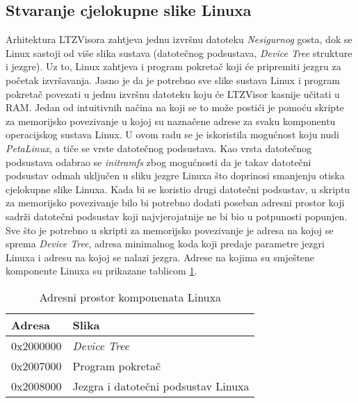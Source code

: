 \documentclass[times, utf8, diplomski, numeric]{fer}
\begin{document}
\subsection{Stvaranje cjelokupne slike Linuxa}
Arhitektura LTZVisora zahtjeva jednu izvršnu datoteku \textit{Nesigurnog} gosta, dok se Linux sastoji od više slika sustava (datotečnog
podsustava, \textit{Device Tree} strukture i jezgre). Uz to, Linux zahtjeva i program pokretač koji će pripremiti jezgru za
početak izvršavanja. Jasno je da je potrebno sve slike sustava Linux i program pokretač povezati u jednu izvršnu datoteku
koju će LTZVisor kasnije učitati u RAM. Jedan od intuitivnih načina na koji se to može postići je pomoću skripte za memorijsko
povezivanje u kojoj su naznačene adrese za svaku komponentu operacijskog sustava Linux. U ovom radu se je iskoristila mogućnost
koju nudi \textit{PetaLinux}, a tiče se vrste datotečnog podsustava. Kao vrsta datotečnog podsustava odabrao se
\textit{initramfs} zbog mogućnosti da je takav datotečni podsustav odmah uključen u sliku jezgre Linuxa što doprinosi smanjenju
otiska cjelokupne slike Linuxa. Kada bi se koristio drugi datotečni podsustav, u skriptu za memorijsko povezivanje bilo bi
potrebno dodati poseban adresni prostor koji sadrži datotečni podsustav koji najvjerojatnije ne bi bio u potpunosti popunjen.
Sve što je potrebno u skripti za memorijsko povezivanje je adresa na kojoj se sprema \textit{Device Tree}, adresa minimalnog
koda koji predaje parametre jezgri Linuxa i adresu na kojoj se nalazi jezgra. Adrese na kojima su smještene komponente Linuxa
su prikazane tablicom \ref{adr_space}.

\begin{table}[H]
  \centering
  \begin{tabular}{ | p{3cm} | p{6cm} |}
    \hline
    \textbf{Adresa} & \textbf{Slika}\\
    \hline
    0x2000000 & \textit{Device Tree}\\
    \hline
    0x2007000 & Program pokretač\\
    \hline
    0x2008000 & Jezgra i datotečni podsustav  Linuxa\\
    \hline
  \end{tabular}
  \caption{Adresni prostor komponenata Linuxa}
  \label{adr_space}
\end{table}
\end{document}
